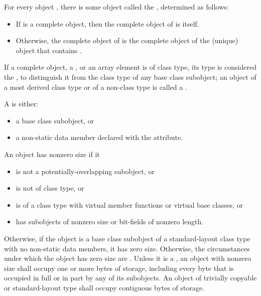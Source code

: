 \pnum
For every object , there is some object called the
 , determined as follows:
\begin{itemize}
\item
If  is a complete object, then the complete object
of  is itself.

\item
Otherwise, the complete object of  is the complete object
of the (unique) object that contains .
\end{itemize}

\pnum
If a complete object, a , or an array element is of
class type, its type is considered the , to distinguish it from the class type of any base class subobject;
an object of a most derived class type or of a non-class type is called a
.

\pnum
A  is either:
\begin{itemize}
\item a base class subobject, or
\item a non-static data member
declared with the  attribute.
\end{itemize}

\pnum
{}%
%
An object has nonzero size if it
\begin{itemize}
\item is not a potentially-overlapping subobject, or
\item is not of class type, or
\item is of a class type with virtual member functions or virtual base classes, or
\item has subobjects of nonzero size or bit-fields of nonzero length.
\end{itemize}
Otherwise, if the object is a base class subobject
of a standard-layout class type
with no non-static data members,
it has zero size.
Otherwise, the circumstances under which the object has zero size
are .
%
Unless it is a ,
an object with nonzero size
shall occupy one or more bytes of storage,
including every byte that is occupied in full or in part
by any of its subobjects.
An object of trivially copyable or
standard-layout type shall occupy contiguous bytes of
storage.

